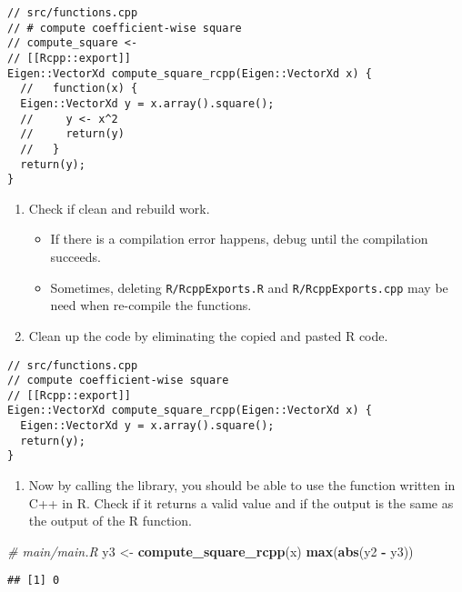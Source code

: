 \documentclass[
]{book}
\newenvironment{Shaded}{\begin{snugshade}}{\end{snugshade}}
\newcommand{\CommentTok}[1]{\textcolor[rgb]{0.56,0.35,0.01}{\textit{#1}}}
\newcommand{\KeywordTok}[1]{\textcolor[rgb]{0.13,0.29,0.53}{\textbf{#1}}}
\newcommand{\NormalTok}[1]{#1}
\newcommand{\OperatorTok}[1]{\textcolor[rgb]{0.81,0.36,0.00}{\textbf{#1}}}
\newcommand{\StringTok}[1]{\textcolor[rgb]{0.31,0.60,0.02}{#1}}
\providecommand{\tightlist}{%
  \setlength{\itemsep}{0pt}\setlength{\parskip}{0pt}}
\begin{document}
\begin{verbatim}
// src/functions.cpp
// # compute coefficient-wise square
// compute_square <-
// [[Rcpp::export]]
Eigen::VectorXd compute_square_rcpp(Eigen::VectorXd x) {
  //   function(x) {
  Eigen::VectorXd y = x.array().square();
  //     y <- x^2
  //     return(y)
  //   }
  return(y);
}
\end{verbatim}

\begin{enumerate}
\def\labelenumi{\arabic{enumi}.}
\setcounter{enumi}{8}
\tightlist
\item
  Check if clean and rebuild work.

  \begin{itemize}
  \tightlist
  \item
    If there is a compilation error happens, debug until the compilation succeeds.
  \item
    Sometimes, deleting \texttt{R/RcppExports.R} and \texttt{R/RcppExports.cpp} may be need when re-compile the functions.
  \end{itemize}
\item
  Clean up the code by eliminating the copied and pasted R code.
\end{enumerate}

\begin{verbatim}
// src/functions.cpp
// compute coefficient-wise square
// [[Rcpp::export]]
Eigen::VectorXd compute_square_rcpp(Eigen::VectorXd x) {
  Eigen::VectorXd y = x.array().square();
  return(y);
}
\end{verbatim}

\begin{enumerate}
\def\labelenumi{\arabic{enumi}.}
\setcounter{enumi}{10}
\tightlist
\item
  Now by calling the library, you should be able to use the function written in C++ in R. Check if it returns a valid value and if the output is the same as the output of the R function.
\end{enumerate}

\begin{Shaded}
\begin{Highlighting}[]
\CommentTok{# main/main.R}
\NormalTok{y3 <-}\StringTok{ }\KeywordTok{compute_square_rcpp}\NormalTok{(x)}
\KeywordTok{max}\NormalTok{(}\KeywordTok{abs}\NormalTok{(y2 }\OperatorTok{-}\StringTok{ }\NormalTok{y3))}
\end{Highlighting}
\end{Shaded}

\begin{verbatim}
## [1] 0
\end{verbatim}
\end{document}
